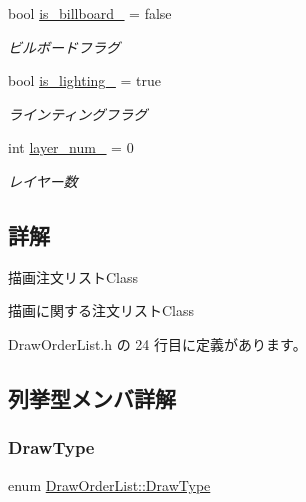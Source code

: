 \begin{DoxyCompactItemize}
bool \mbox{\hyperlink{class_draw_order_list_ae9a77121ff108d8f0ee0c73065f99a75}{is\+\_\+billboard\+\_\+}} = false
\begin{DoxyCompactList}\small\item\em ビルボードフラグ \end{DoxyCompactList}\item 
bool \mbox{\hyperlink{class_draw_order_list_a26e72a0f47cc2c791eeb87fe6aadeee9}{is\+\_\+lighting\+\_\+}} = true
\begin{DoxyCompactList}\small\item\em ラインティングフラグ \end{DoxyCompactList}\item 
int \mbox{\hyperlink{class_draw_order_list_aff49851688a106fc572abab6e65506b8}{layer\+\_\+num\+\_\+}} = 0
\begin{DoxyCompactList}\small\item\em レイヤー数 \end{DoxyCompactList}\end{DoxyCompactItemize}


\subsection{詳解}
描画注文リスト\+Class 

描画に関する注文リスト\+Class 

 Draw\+Order\+List.\+h の 24 行目に定義があります。



\subsection{列挙型メンバ詳解}
\mbox{\label{class_draw_order_list_a6c9b9ceb312c16d399ef355f4f3486bb}} 
\subsubsection{\texorpdfstring{Draw\+Type}{DrawType}}
{\footnotesize\ttfamily enum \mbox{\hyperlink{class_draw_order_list_a6c9b9ceb312c16d399ef355f4f3486bb}{Draw\+Order\+List\+::\+Draw\+Type}}}

